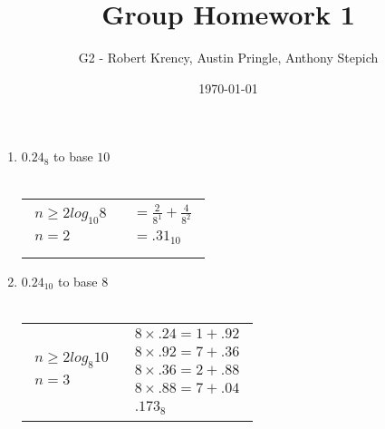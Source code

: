 \documentclass[12pt]{article}
\title{Group Homework 1}
\author{G2 - Robert Krency, Austin Pringle, Anthony Stepich}
\date{\today}
\begin{document}
\maketitle

\begin{enumerate}

     \item $0.24_{8}$ to base $10$ \\ \\
     \begin{tabular}{l | l}
         
        $\begin{aligned}
            n \geq 2log_{10}8 \\
            n = 2 \\
        \end{aligned}$

        &

        $\begin{aligned}
            = \frac{2}{8^1} + \frac{4}{8^2} \\
            = \boxed{.31_{10}} \\
        \end{aligned}$

     \end{tabular}
     

     \item $0.24_{10}$ to base $8$ \\ \\
     \begin{tabular}{l | l}

        $\begin{aligned}
            n \geq 2log_{8}10 \\
            n = 3 \\
        \end{aligned}$

        &

        $\begin{aligned}
            8 \times .24 = 1 + .92 \\
            8 \times .92 = 7 + .36 \\
            8 \times .36 = 2 + .88 \\ 
            8 \times .88 = 7 + .04 \\
            \boxed{.173_{8}}
        \end{aligned}$

     \end{tabular}
     


\end{enumerate}
\end{document}
